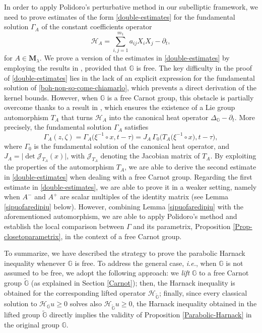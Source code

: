 \documentclass[11pt,a4paper]{article}
\numberwithin{equation}{section}
\def \tt {\tilde}
\def \GG {{\mathbb{G}}}
\def \p {\partial}
\def \H {\mathscr{H}_\GG}
\def \HG {\mathscr{H}_{\tilde\GG}}
\def \G {{\Gamma}}
\def \l {{\lambda}}
\def \t {{\tau}}
\def \x {{\xi}}
\def \z {{\zeta}}
\begin{document}
{{In order to apply Polidoro's perturbative method in our subelliptic framework, we need to prove estimates of the form \eqref{double-estimates} for the fundamental solution $\Gamma_A$ of the constant coefficients operator
\begin{equation}\label{boh-non-so-come-chiamarlo}
	{\mathscr{H}}_A=\sum_{i,j=1}^{m_1}a_{ij}X_iX_j-\p_t,
\end{equation}
for $A \in \textbf{M}_\l$. We  prove a version of the estimates in \eqref{double-estimates} by employing the results in \cite{bonfiglioli2004families, bonfiglioli2002uniform}, provided that $\GG$ is free. The key difficulty in the proof of \eqref{double-estimates} lies in the lack of an explicit expression for the fundamental solution of \eqref{boh-non-so-come-chiamarlo}, which prevents a direct derivation of the kernel bounds. However, when $\GG$ is a free Carnot group, this obstacle is partially overcome thanks to a result in \cite{bonfiglioli2004families}, which ensures the existence of a Lie group automorphism $T_A$ that turns $\mathscr H_A$ into the canonical heat operator $\Delta_\GG -\p_t$. More precisely, the fundamental solution $\G_A$ satisfies
\begin{equation}\label{automor}
	\G_A(z,\z)= \G_A\Big(\x^{-1}\circ x,t-\t\Big)=J_A\, \G_0\Big(T_A\big(\x^{-1}\circ x	\big),t-\t\Big),
\end{equation}
where $\G_0$ is the fundamental solution of the canonical heat operator, and $J_A = \big|\det \mathcal{J}_{T_{A}}(x)\big|$, with $\mathcal{J}_{T_A}$ denoting the Jacobian matrix of $T_A$. By exploiting the properties of the automorphism $T_A$, we are able to derive the second estimate in \eqref{double-estimates} when dealing with a free Carnot group. Regarding the first estimate in \eqref{double-estimates}, we are able to prove it in a weaker setting, namely when $A^-$ and $A^+$ are scalar multiples of the identity matrix (see Lemma \ref{sipuofaredipiu} below). However,  combining Lemma \ref{sipuofaredipiu} with the aforementioned automorphism, we are able to apply Polidoro's method and establish the local comparison between $\G$ and its parametrix, Proposition \ref{Prop-closetoparametrix}, in the context of a free Carnot group.

\medskip

To summarize, we have described the strategy to prove the parabolic Harnack inequality whenever $\GG$ is free. To address the general case, \emph{i.e.}, when $\GG$ is not assumed to be free, we adopt the following approach: we \emph{lift} $\GG$ to a free Carnot group $\tilde{\GG}$ (as explained in Section \ref{Carnot}); then, the Harnack inequality is obtained for the corresponding lifted operator $\HG$; finally, since every classical solution to $\H u \geq 0$ solves also $\HG u \geq 0$, the Harnack inequality obtained in the lifted group $\tt\GG$ directly implies the validity of Proposition \ref{Parabolic-Harnack} in the original group $\GG$.

}}
\end{document}
